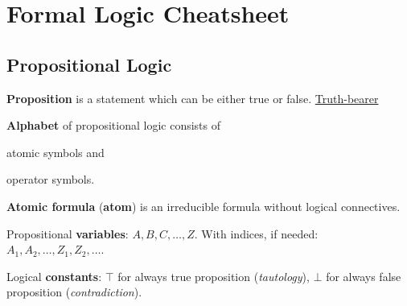 \documentclass[a4paper,10pt]{article}
\begin{document}

\setcounter{section}{3}%
\section{Formal Logic Cheatsheet}

\subsection{Propositional Logic%
\texorpdfstring{\normalsize\protect{}}{}}

\begin{terms}
    \item \textbf{Proposition} is a statement which can be either true or false.
    \hfill\href{https://en.wikipedia.org/wiki/Truth-bearer}{Truth-bearer}

    \item \textbf{Alphabet} of propositional logic consists of
    \begin{mylist}
        \item atomic symbols and
        \item operator symbols.
    \end{mylist}



    \item \textbf{Atomic formula} (\textbf{atom}) is an irreducible formula without logical connectives.
    \begin{terms}
        \item Propositional \textbf{variables}: $A, B, C, \dotsc, Z$. With indices, if needed: $A_1, A_2, \dotsc, Z_1, Z_2, \dotsc$.

        \item Logical \textbf{constants}: $\top$ for always true proposition (\textit{tautology}), $\bot$ for always false proposition (\textit{contradiction}).
    \end{terms}


\end{terms}
\end{document}

